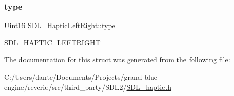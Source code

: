 \subsubsection{\texorpdfstring{type}{type}}
{\footnotesize\ttfamily Uint16 S\+D\+L\+\_\+\+Haptic\+Left\+Right\+::type}

\mbox{\hyperlink{_s_d_l__haptic_8h_ae047624d8458ff6400887c37a36f86d3}{S\+D\+L\+\_\+\+H\+A\+P\+T\+I\+C\+\_\+\+L\+E\+F\+T\+R\+I\+G\+HT}} 

The documentation for this struct was generated from the following file\+:\begin{DoxyCompactItemize}
\item 
C\+:/\+Users/dante/\+Documents/\+Projects/grand-\/blue-\/engine/reverie/src/third\+\_\+party/\+S\+D\+L2/\mbox{\hyperlink{_s_d_l__haptic_8h}{S\+D\+L\+\_\+haptic.\+h}}\end{DoxyCompactItemize}
